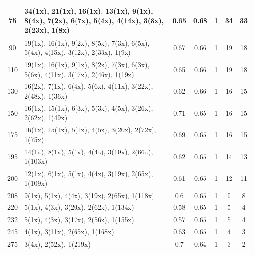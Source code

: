 \begin{small}
\begin{longtable}{|c|p{4cm}|c|c|c|c|c|}
75 & 34(1x), 21(1x), 16(1x), 13(1x), 9(1x), 8(4x), 7(2x), 6(7x), 5(4x), 4(14x), 3(8x), 2(23x), 1(8x) & \cellcolor{colorOK}  0.65 & \cellcolor{colorOK} 0.68 & 1 & 34 & \cellcolor{colorBad} 33 \\   \hline
90 & 19(1x), 16(1x), 9(2x), 8(5x), 7(3x), 6(5x), 5(4x), 4(15x), 3(12x), 2(33x), 1(9x) & \cellcolor{colorBad}  0.67 & \cellcolor{colorBad} 0.66 & 1 & 19 & \cellcolor{colorBad} 18 \\   \hline
110 & 19(1x), 16(1x), 9(1x), 8(2x), 7(3x), 6(3x), 5(6x), 4(11x), 3(17x), 2(46x), 1(19x) & \cellcolor{colorOK}  0.65 & \cellcolor{colorOK} 0.66 & 1 & 19 & \cellcolor{colorBad} 18 \\   \hline
130 & 16(2x), 7(1x), 6(4x), 5(6x), 4(11x), 3(22x), 2(48x), 1(36x) & \cellcolor{colorOK}  0.62 & \cellcolor{colorOK} 0.66 & 1 & 16 & \cellcolor{colorBad} 15 \\   \hline
150 & 16(1x), 15(1x), 6(3x), 5(3x), 4(5x), 3(26x), 2(62x), 1(49x) & \cellcolor{colorBad}  0.71 & \cellcolor{colorBad} 0.65 & 1 & 16 & \cellcolor{colorBad} 15 \\   \hline
175 & 16(1x), 15(1x), 5(1x), 4(5x), 3(20x), 2(72x), 1(75x) & \cellcolor{colorBad}  0.69 & \cellcolor{colorBad} 0.65 & 1 & 16 & \cellcolor{colorBad} 15 \\   \hline
195 & 14(1x), 8(1x), 5(1x), 4(4x), 3(19x), 2(66x), 1(103x) & \cellcolor{colorOK}  0.62 & \cellcolor{colorOK} 0.65 & 1 & 14 & \cellcolor{colorBad} 13 \\   \hline
200 & 12(1x), 6(1x), 5(1x), 4(4x), 3(19x), 2(65x), 1(109x) & \cellcolor{colorOK}  0.61 & \cellcolor{colorOK} 0.65 & 1 & 12 & \cellcolor{colorGood} 11 \\   \hline
208 & 9(1x), 5(1x), 4(4x), 3(19x), 2(65x), 1(118x) & \cellcolor{colorOK}  0.6 & \cellcolor{colorOK} 0.65 & 1 & 9 & \cellcolor{colorGood} 8 \\   \hline
220 & 5(1x), 4(3x), 3(20x), 2(62x), 1(134x) & \cellcolor{colorOK}  0.58 & \cellcolor{colorOK} 0.65 & 1 & 5 & \cellcolor{colorGood} 4 \\   \hline
232 & 5(1x), 4(3x), 3(17x), 2(56x), 1(155x) & \cellcolor{colorOK}  0.57 & \cellcolor{colorOK} 0.65 & 1 & 5 & \cellcolor{colorGood} 4 \\   \hline
245 & 4(1x), 3(11x), 2(65x), 1(168x) & \cellcolor{colorOK}  0.63 & \cellcolor{colorOK} 0.65 & 1 & 4 & \cellcolor{colorGood} 3 \\   \hline
275 & 3(4x), 2(52x), 1(219x) & \cellcolor{colorBad}  0.7 & \cellcolor{colorBad} 0.64 & 1 & 3 & \cellcolor{colorGood} 2 \\   \hline

\end{longtable}
\end{small}
